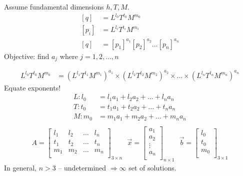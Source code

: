 \documentclass[
	date={August 26{,} 2024}
]{math486notes}
\begin{document}
Assume fundamental dimensions $h, T, M$.
\begin{equation*}
\begin{aligned}
	[q] &= L^{l_{0}}T^{t_{0}}M^{m_{0}}\\
	[p_{i}] &= L^{l_{i}}T^{t_{i}}M^{m_{i}}\\
	[q] &= [p_{1}]^{a_{1}}[p_{2}]^{a_{2}}\dots[p_{n}]^{a_{n}}
\end{aligned}
\end{equation*}
Objective: find $a_{j}$ where $j=1,2,\dots,n$

\begin{equation*}
\begin{aligned}
	L^{l_{0}}T^{t_{0}}M^{m_{0}} &= \left( L^{l_{1}}T^{t_{1}}M^{m_{1}} \right)^{a_{1}}\times\left( L^{l_{2}}T^{t_{2}}M^{m_{2}} \right)^{a_{2}}\times\dots\times\left( L^{l_{n}}T^{t_{n}}M^{m_{n}} \right)^{a_{n}}
\end{aligned}
\end{equation*}
Equate exponents!
\begin{equation*}
\begin{aligned}
	L: l_{0} &= l_{1}a_{1} + l_{2}a_{2} + \dots + l_{n}a_{n}\\
	T: t_{0} &= t_{1}a_{1} + t_{2}a_{2} + \dots + t_{n}a_{n}\\
	M: m_{0} &= m_{1}a_{1} + m_{2}a_{2} + \dots + m_{n}a_{n}\\
\end{aligned}
\end{equation*}
\begin{equation*}
\begin{aligned}
	A = \left[ \begin{array}{cccc}
		l_{1} & l_{2} & \dots & l_{n}\\
		t_{1} & t_{2} & \dots & t_{n}\\
		m_{1} & m_{2} & \dots & m_{n}\\
	\end{array} \right]_{3\times{}n}\ \ \
	\vec{x} = \left[ \begin{array}{c}
		a_{1}\\
		a_{2}\\
		\vdots\\
		a_{n}\\
	\end{array} \right]_{n\times1}\ \ \
	\vec{b} = \left[ \begin{array}{c}
		l_{0}\\
		t_{0}\\
		m_{0}\\
	\end{array} \right]_{3\times1}
\end{aligned}
\end{equation*}
In general, $n>3$ -- undetermined $\Rightarrow\infty$ set of solutions.
\end{document}
